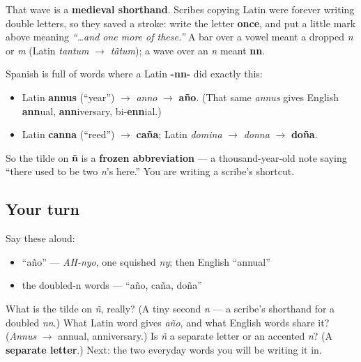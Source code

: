 \begin{culture}
That wave is a \textbf{medieval shorthand}. Scribes copying Latin were forever writing double letters, so they saved a stroke: write the letter \textbf{once}, and put a little mark above meaning \emph{\textquotedblleft{}…and one more of these.\textquotedblright{}} A bar over a vowel meant a dropped \emph{n} or \emph{m} (Latin \emph{tantum} $\to$ \emph{tãtum}); a wave over an \emph{n} meant \textbf{nn}.

Spanish is full of words where a Latin \textbf{-nn-} did exactly this:

\begin{itemize}
\raggedright
  \item Latin \textbf{annus} (\textquotedblleft{}year\textquotedblright{}) $\to$ \emph{anno} $\to$ \textbf{año}. (That same \emph{annus} gives English \textbf{ann}ual, \textbf{ann}iversary, bi-\textbf{enn}ial.)
  \item Latin \textbf{canna} (\textquotedblleft{}reed\textquotedblright{}) $\to$ \textbf{caña}; Latin \emph{domina} $\to$ \emph{donna} $\to$ \textbf{doña}.
\end{itemize}

So the tilde on \textbf{ñ} is a \textbf{frozen abbreviation} — a thousand-year-old note saying \textquotedblleft{}there used to be two \emph{n}'s here.\textquotedblright{} You are writing a scribe's shortcut.
\end{culture}

\subsection*{Your turn}
Say these aloud:

\begin{itemize}
\raggedright
  \item \textquotedblleft{}año\textquotedblright{} — \emph{AH-nyo}, one squished \emph{ny}; then English \textquotedblleft{}annual\textquotedblright{}
  \item the doubled-n words — \textquotedblleft{}año, caña, doña\textquotedblright{}
\end{itemize}

\begin{tcolorbox}[breakable,colback=teal!4,colframe=teal!35!black,title={Before you move on}]
What is the tilde on \emph{ñ}, really? (A tiny second \emph{n} — a scribe's shorthand for a doubled \emph{nn}.) What Latin word gives \emph{año}, and what English words share it? (\emph{Annus} $\to$ annual, anniversary.) Is \emph{ñ} a separate letter or an accented \emph{n}? (A \textbf{separate letter}.) Next: the two everyday words you will be writing it in.
\end{tcolorbox}

